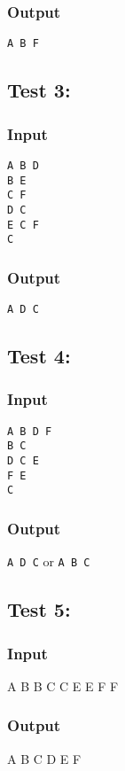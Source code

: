 \documentclass[twocolumn]{extarticle}
\begin{document}
\subsubsection*{Output}
\texttt{A B F}

\subsection*{Test 3:}
\subsubsection*{Input}
\texttt{A B D\\
B E\\
C F\\
D C\\
E C F\\
C}

\subsubsection*{Output}
\texttt{A D C}

\subsection*{Test 4:}
\subsubsection*{Input}
\texttt{A B D F\\
B C\\
D C E\\
F E\\
C}

\subsubsection*{Output}
\texttt{A D C}
or
\texttt{A B C}

\subsection*{Test 5:}
\subsubsection*{Input}
A B
B C
C E
E F
F

\subsubsection*{Output}
A B C D E F
\end{document}
